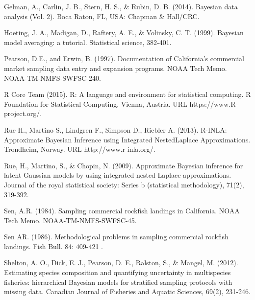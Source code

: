 \documentclass[12pt]{article}
\begin{document}
%
\begin{thebibliography}{1}

%
 Gelman, A., Carlin, J. B., Stern, H. S., \& Rubin, D. B.
(2014). Bayesian data analysis (Vol. 2). Boca Raton, FL, USA: Chapman \&
Hall/CRC.

%
 Hoeting, J. A., Madigan, D., Raftery, A. E., \& Volinsky, C. T.
(1999). Bayesian model averaging: a tutorial. Statistical science, 382-401.

%
 Pearson, D.E., and Erwin, B. (1997). Documentation of
California’s commercial market sampling data entry and expansion programs.
NOAA Tech Memo. NOAA-TM-NMFS-SWFSC-240.

%
 R Core Team (2015). R: A language and environment for
statistical computing. R Foundation for Statistical Computing, Vienna,
Austria. URL https://www.R-project.org/.

%
 Rue H., Martino S., Lindgren F., Simpson D., Riebler A.
(2013). R-INLA: Approximate Bayesian Inference using Integrated NestedLaplace
Approximations. Trondheim, Norway. URL http://www.r-inla.org/.

%
 Rue, H., Martino, S., \& Chopin, N. (2009). Approximate
Bayesian inference for latent Gaussian models by using integrated nested Laplace
approximations. Journal of the royal statistical society: Series b
(statistical methodology), 71(2), 319-392.

%
 Sen, A.R. (1984). Sampling commercial rockfish landings in
California. NOAA Tech Memo. NOAA-TM-NMFS-SWFSC-45.

%
 Sen AR. (1986). Methodological problems in sampling
commercial rockfish landings. Fish Bull. 84: 409-421 .

%
 Shelton, A. O., Dick, E. J., Pearson, D. E., Ralston,
S., \& Mangel, M. (2012). Estimating species composition and quantifying
uncertainty in multispecies fisheries: hierarchical Bayesian models for
stratified sampling protocols with missing data. Canadian Journal of Fisheries
and Aquatic Sciences, 69(2), 231-246.

\end{thebibliography}

%
\end{document}

